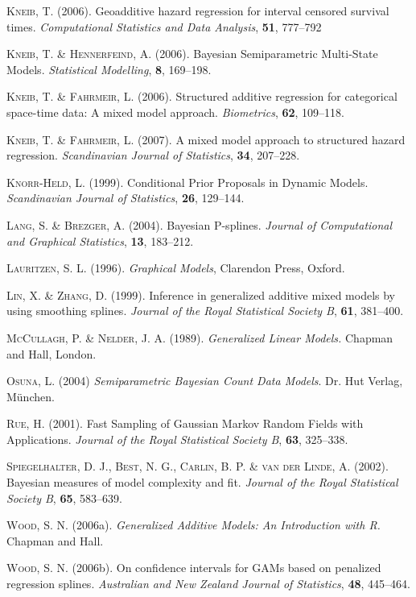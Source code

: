 \begin{thebibliography}{99}
 {\scshape Kneib, T.} (2006).
 Geoadditive hazard regression for interval censored survival times.
 {\it Computational Statistics and Data Analysis}, {\bf 51}, 777--792

 {\scshape Kneib, T. \& Hennerfeind, A.} (2006).
 Bayesian Semiparametric Multi-State Models.
 {\it Statistical Modelling}, {\bf 8}, 169--198.

 {\scshape Kneib, T. \& Fahrmeir, L.} (2006).
 Structured additive regression for categorical space-time data: A mixed model approach.
 {\it Biometrics}, {\bf 62}, 109--118.

 {\scshape Kneib, T. \& Fahrmeir, L.} (2007).
 A mixed model approach to structured hazard regression.
 {\it Scandinavian Journal of Statistics}, {\bf 34}, 207--228.

 {\scshape Knorr-Held, L.} (1999).
 Conditional Prior Proposals in Dynamic Models.
 {\it Scandinavian Journal of Statistics}, {\bf 26}, 129--144.

 {\scshape Lang, S. \& Brezger, A.} (2004).
 Bayesian P-splines.
 {\it Journal of Computational and Graphical Statistics}, {\bf 13}, 183--212.

 {\scshape Lauritzen, S. L.} (1996).
 {\it Graphical Models},
 Clarendon Press, Oxford.

 {\scshape Lin, X. \& Zhang, D.} (1999).
 Inference in generalized additive mixed models by using smoothing splines.
 {\it Journal of the Royal Statistical Society B}, {\bf 61}, 381--400.

 {\scshape McCullagh, P. \& Nelder, J. A.} (1989).
 {\it Generalized Linear Models.}
 Chapman and Hall, London.

 {\scshape Osuna, L.} (2004)
 {\it Semiparametric Bayesian Count Data Models}.
 Dr. Hut Verlag, M\"{u}nchen.

 {\scshape Rue, H.} (2001).
 Fast Sampling of Gaussian Markov Random Fields with Applications.
 {\it Journal of the Royal Statistical Society B}, {\bf 63}, 325--338.

 {\scshape Spiegelhalter, D. J., Best, N. G., Carlin, B. P. \& van der Linde, A.} (2002).
 Bayesian measures of model complexity and fit.
 {\it Journal of the Royal Statistical Society B}, {\bf 65}, 583--639.

 {\scshape Wood, S. N.} (2006a).
 {\it Generalized Additive Models: An Introduction with R.}
 Chapman and Hall.

 {\scshape Wood, S. N.} (2006b).
 On confidence intervals for GAMs based on penalized regression splines.
 {\it Australian and New Zealand Journal of Statistics}, {\bf 48}, 445--464.
\end{thebibliography}
